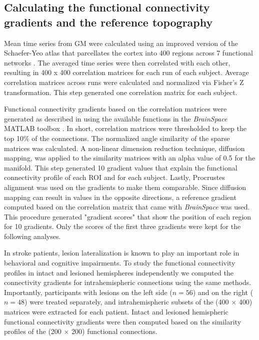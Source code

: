 \documentclass[fleqn,10pt]{wlscirep}
\begin{document}
\subsection*{Calculating the functional connectivity gradients and the reference topography}
Mean time series from GM were calculated using an improved version of the Schaefer-Yeo atlas that parcellates the cortex into 400 regions across 7 functional networks \citep{Schaefer_2017, glen2021improved}. The averaged time series were then correlated with each other, resulting in 400 x 400 correlation matrices for each run of each subject. Average correlation matrices across runs were calculated and normalized via Fisher's Z transformation. This step generated one correlation matrix for each subject. 

Functional connectivity gradients based on the correlation matrices were generated as described in \citet{margulies2016situating} using the available functions in the \emph{BrainSpace} MATLAB toolbox \citep{vos2020brainspace}. In short, correlation matrices were thresholded to keep the top 10\% of the connections. The normalized angle similarity of the sparse matrices was calculated. A non-linear dimension reduction technique, diffusion mapping, was applied to the similarity matrices with an alpha value of 0.5 for the manifold. This step generated 10 gradient values that explain the functional connectivity profile of each ROI and for each subject. Lastly, Procrustes alignment was used on the gradients to make them comparable. Since diffusion mapping can result in values in the opposite directions, a reference gradient computed based on the correlation matrix that came with \emph{BrainSpace} was used. This procedure generated "gradient scores" that show the position of each region for 10 gradients. Only the scores of the first three gradients were kept for the following analyses.

In stroke patients, lesion lateralization is known to play an important role in behavioral and cognitive impairments. To study the functional connectivity profiles in intact and lesioned hemispheres independently we computed the connectivity gradients for intrahemispheric connections using the same methods. Importantly, participants with lesions on the left side ($n = 56$) and on the right ($n = 48$) were treated separately, and intrahemispheric subsets of the (400 $\times$ 400) matrices were extracted for each patient. Intact and lesioned hemispheric functional connectivity gradients were then computed based on the similarity profiles of the (200 $\times$ 200) functional connections. %
\end{document}
